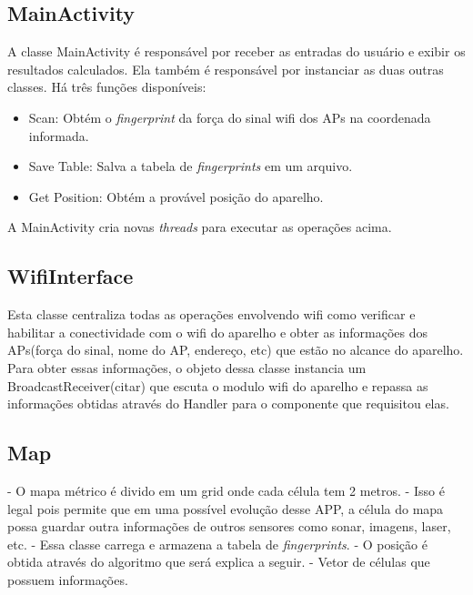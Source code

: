   \subsection{MainActivity}
  A classe MainActivity é responsável por receber as entradas do usuário e exibir os resultados calculados.
  Ela também é responsável por instanciar as duas outras classes. Há três funções disponíveis: 
  \begin{itemize}
   \item Scan: Obtém o \textit{fingerprint} da força do sinal wifi dos APs na coordenada informada.
   \item Save Table: Salva a tabela de \textit{fingerprints} em um arquivo.
   \item Get Position: Obtém a provável posição do aparelho. 
  \end{itemize}

  A MainActivity cria novas \textit{threads} para executar as operações acima.
  
  \subsection{WifiInterface}
  
  Esta classe centraliza todas as operações envolvendo wifi como verificar e habilitar a conectividade
  com o wifi do aparelho e obter as informações dos APs(força do sinal, nome do AP, endereço, etc) 
  que estão no alcance do aparelho. Para obter essas informações, o objeto dessa classe
  instancia um BroadcastReceiver(citar)   que escuta o modulo wifi do aparelho e repassa 
  as informações obtidas através do Handler para o componente que requisitou elas.
  
  \subsection{Map}
  - O mapa métrico é divido em um grid onde cada célula tem 2 metros.
  - Isso é legal pois permite que em uma possível evolução desse APP, a célula do mapa possa guardar
  outra informações de outros sensores como sonar, imagens, laser, etc.
  - Essa classe carrega e armazena a tabela de \textit{fingerprints}.
  - O posição é obtida através do algoritmo que será explica a seguir.
  - Vetor de células que possuem informações.
  
